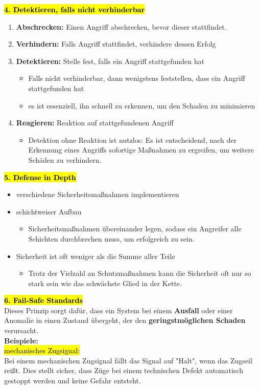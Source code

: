 \documentclass[a4paper, 10pt]{article}
\begin{document}
\noindent\hl{\textbf{4. Detektieren, falls nicht verhinderbar}}
\begin{enumerate}
    \item \textbf{Abschrecken:} Einen Angriff abschrecken, bevor dieser stattfindet.
    \item \textbf{Verhindern:} Falls  Angriff stattfindet, verhindere dessen Erfolg
    \item \textbf{Detektieren:} Stelle fest, falls ein Angriff stattgefunden hat
    \begin{itemize}
        \item Falls nicht verhinderbar, dann wenigstens feststellen, dass ein Angriff stattgefunden hat
        \item es ist essenziell, ihn schnell zu erkennen, um den Schaden zu minimieren
    \end{itemize}
    \item \textbf{Reagieren:} Reaktion auf stattgefundenen Angriff
    \begin{itemize}
        \item Detektion ohne Reaktion ist nutzlos: Es ist entscheidend, nach der Erkennung eines Angriffs sofortige Maßnahmen zu ergreifen, um weitere Schäden zu verhindern.
    \end{itemize}
\end{enumerate}
\textbf{\hl{5. Defense in Depth}}
\begin{itemize}
    \item verschiedene Sicherheitsmaßnahmen implementieren
    \item schichtweiser Aufbau
    \begin{itemize}
        \item Sicherheitsmaßnahmen übereinander legen, sodass ein Angreifer alle Schichten durchbrechen muss, um erfolgreich zu sein.
    \end{itemize}
    \item Sicherheit ist oft weniger als die Summe aller Teile
    \begin{itemize}
        \item Trotz der Vielzahl an Schutzmaßnahmen kann die Sicherheit oft nur so stark sein wie das schwächste Glied in der Kette.
    \end{itemize}
\end{itemize}
\textbf{\hl{6. Fail-Safe Standards}}\\[3mm]
Dieses Prinzip sorgt dafür, dass ein System bei einem \textbf{Ausfall} oder einer Anomalie in einen Zustand übergeht, der den \textbf{geringstmöglichen Schaden} verursacht.\\[3mm]
\textbf{Beispiele:}\\[2mm]
\hl{mechanisches Zugsignal:}\\
 Bei einem mechanischen Zugsignal fällt das Signal auf "Halt", wenn das Zugseil reißt. Dies stellt sicher, dass Züge bei einem technischen Defekt automatisch gestoppt werden und keine Gefahr entsteht.\\
\end{document}

